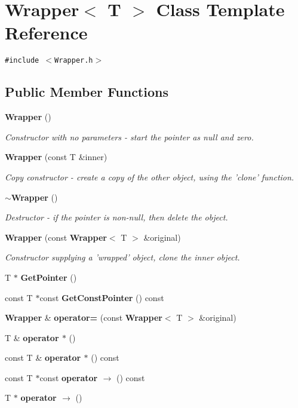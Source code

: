 \section{Wrapper$<$ T $>$ Class Template Reference}
\label{classWrapper}
{\tt \#include $<$Wrapper.h$>$}

\subsection*{Public Member Functions}
\begin{CompactItemize}
\item 
{\bf Wrapper} ()
\begin{CompactList}\small\item\em Constructor with no parameters - start the pointer as null and zero. \item\end{CompactList}\item 
{\bf Wrapper} (const T \&inner)
\begin{CompactList}\small\item\em Copy constructor - create a copy of the other object, using the 'clone' function. \item\end{CompactList}\item 
{\bf $\sim$Wrapper} ()
\begin{CompactList}\small\item\em Destructor - if the pointer is non-null, then delete the object. \item\end{CompactList}\item 
{\bf Wrapper} (const {\bf Wrapper}$<$ T $>$ \&original)
\begin{CompactList}\small\item\em Constructor supplying a 'wrapped' object, clone the inner object. \item\end{CompactList}\item 
T $\ast$ {\bf GetPointer} ()
\item 
const T $\ast$const {\bf GetConstPointer} () const 
\item 
{\bf Wrapper} \& {\bf operator=} (const {\bf Wrapper}$<$ T $>$ \&original)
\item 
T \& {\bf operator $\ast$} ()
\item 
const T \& {\bf operator $\ast$} () const 
\item 
const T $\ast$const {\bf operator $\rightarrow$ } () const 
\item 
T $\ast$ {\bf operator $\rightarrow$ } ()
\end{CompactItemize}
